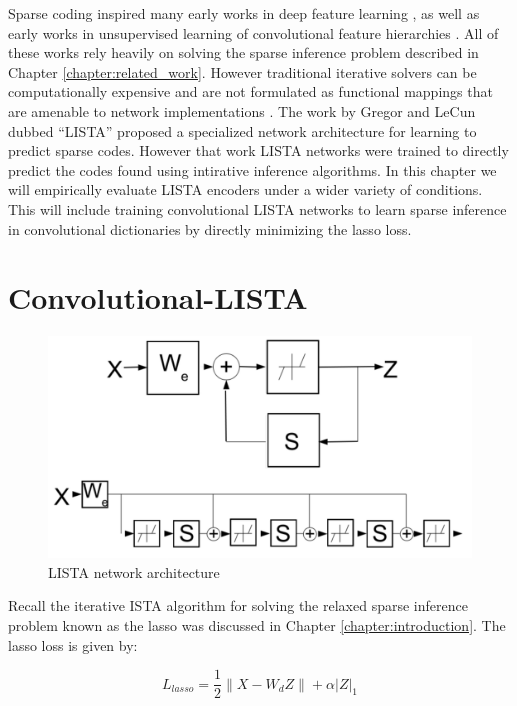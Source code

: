 Sparse coding inspired many early works in deep feature learning
\cite{SC,SAE,SAE2}, as well as early works in unsupervised learning of
convolutional feature hierarchies \cite{ConvSC}. All of these works rely
heavily on solving the sparse inference problem described in Chapter
\ref{chapter:related_work}.  However traditional iterative solvers can be
computationally expensive and are not formulated as functional mappings that
are amenable to network implementations \cite{FISTA}. The work by Gregor and
LeCun dubbed ``LISTA'' \cite{LISTA} proposed a specialized network architecture
for learning to predict sparse codes. However that work LISTA networks were
trained to directly predict the codes found using intirative inference
algorithms.  In this chapter we will empirically evaluate LISTA encoders under
a wider variety of conditions. This will include training convolutional LISTA
networks to learn sparse inference in convolutional dictionaries by directly
minimizing the lasso loss.

\section{Convolutional-LISTA} 

\begin{figure}
\centering
\includegraphics[scale=0.3]{./figures/LISTA/LISTA.pdf}
\caption{LISTA network architecture} 
\label{fig:LISTA} 
\end{figure}  

Recall the iterative ISTA algorithm for solving the relaxed sparse inference problem
known as the lasso was discussed in Chapter \ref{chapter:introduction}. 
The lasso loss is given by:
  
\begin{equation}
L_{lasso} = \frac{1}{2}\|X-W_dZ\| + \alpha |Z|_1 
\label{eqn:lasso} 
\end{equation} 

